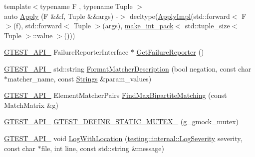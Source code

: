 \begin{DoxyCompactItemize}
\item 
{\footnotesize template$<$typename F , typename Tuple $>$ }\\auto \mbox{\hyperlink{namespacetesting_1_1internal_aa4d652d33ef1ce203c40ebe2d3ca6b1b}{Apply}} (F \&\&f, Tuple \&\&args) -\/$>$ decltype(\mbox{\hyperlink{namespacetesting_1_1internal_a3a3b201170370a28f0acaf0de785cded}{Apply\+Impl}}(std\+::forward$<$ F $>$(f), std\+::forward$<$ Tuple $>$(args), \mbox{\hyperlink{structtesting_1_1internal_1_1make__int__pack}{make\+\_\+int\+\_\+pack}}$<$ std\+::tuple\+\_\+size$<$ Tuple $>$\+::\mbox{\hyperlink{_obj__test_2lib_2googletest-master_2googlemock_2test_2gmock-matchers__test_8cc_a337b8a670efc0b086ad3af163f3121b6}{value}} $>$()))
\item 
\mbox{\hyperlink{_obj__test_2lib_2googletest-release-1_88_81_2googletest_2include_2gtest_2internal_2gtest-port_8h_aa73be6f0ba4a7456180a94904ce17790}{G\+T\+E\+S\+T\+\_\+\+A\+P\+I\+\_\+}} Failure\+Reporter\+Interface $\ast$ \mbox{\hyperlink{namespacetesting_1_1internal_a93a00bf550dcc6b1de870d24c624869c}{Get\+Failure\+Reporter}} ()
\item 
\mbox{\hyperlink{_obj__test_2lib_2googletest-release-1_88_81_2googletest_2include_2gtest_2internal_2gtest-port_8h_aa73be6f0ba4a7456180a94904ce17790}{G\+T\+E\+S\+T\+\_\+\+A\+P\+I\+\_\+}} std\+::string \mbox{\hyperlink{namespacetesting_1_1internal_ace0ed89106e622e9b5da449ae269616d}{Format\+Matcher\+Description}} (bool negation, const char $\ast$matcher\+\_\+name, const \mbox{\hyperlink{namespacetesting_1_1internal_a4ad7524c75dfadde584df6d5b4742aa8}{Strings}} \&param\+\_\+values)
\item 
\mbox{\hyperlink{_obj__test_2lib_2googletest-release-1_88_81_2googletest_2include_2gtest_2internal_2gtest-port_8h_aa73be6f0ba4a7456180a94904ce17790}{G\+T\+E\+S\+T\+\_\+\+A\+P\+I\+\_\+}} Element\+Matcher\+Pairs \mbox{\hyperlink{namespacetesting_1_1internal_ae30bd8357c179334b2b09b0d689efccc}{Find\+Max\+Bipartite\+Matching}} (const Match\+Matrix \&g)
\item 
\mbox{\hyperlink{_obj__test_2lib_2googletest-release-1_88_81_2googletest_2include_2gtest_2internal_2gtest-port_8h_aa73be6f0ba4a7456180a94904ce17790}{G\+T\+E\+S\+T\+\_\+\+A\+P\+I\+\_\+}} \mbox{\hyperlink{namespacetesting_1_1internal_a8c4aa7be8daa7b60e293071d70a89584}{G\+T\+E\+S\+T\+\_\+\+D\+E\+F\+I\+N\+E\+\_\+\+S\+T\+A\+T\+I\+C\+\_\+\+M\+U\+T\+E\+X\+\_\+}} (g\+\_\+gmock\+\_\+mutex)
\item 
\mbox{\hyperlink{_obj__test_2lib_2googletest-release-1_88_81_2googletest_2include_2gtest_2internal_2gtest-port_8h_aa73be6f0ba4a7456180a94904ce17790}{G\+T\+E\+S\+T\+\_\+\+A\+P\+I\+\_\+}} void \mbox{\hyperlink{namespacetesting_1_1internal_a07f4411f23f8b1b731858be9dda3fdcc}{Log\+With\+Location}} (\mbox{\hyperlink{namespacetesting_1_1internal_a203d1a8a2147a53d12bbdae40d443914}{testing\+::internal\+::\+Log\+Severity}} severity, const char $\ast$file, int line, const std\+::string \&message)

\end{DoxyCompactItemize}
